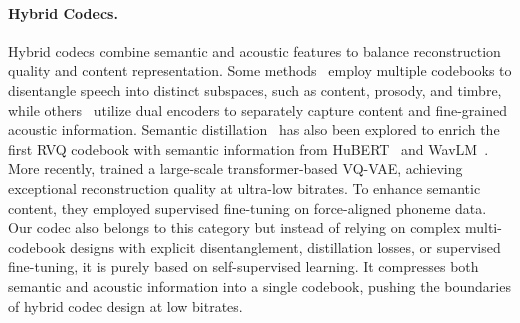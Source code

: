 \paragraph{Hybrid Codecs.}
Hybrid codecs combine semantic and acoustic features to balance reconstruction quality and content representation. Some methods~\cite{ju2024facodec, jiang2024unicodec, zheng2024freecodec} employ multiple codebooks to disentangle speech into distinct subspaces, such as content, prosody, and timbre, while others~\cite{liu2024semanticodec} utilize dual encoders to separately capture content and fine-grained acoustic information. Semantic distillation~\cite{zhang2024speechtokenizer, defossez2024moshi} has also been explored to enrich the first RVQ codebook with semantic information from HuBERT~\cite{hsu2021hubert} and WavLM~\cite{chen2022wavlm}. More recently, \citet{parker2024scaling} trained a large-scale transformer-based VQ-VAE, achieving exceptional reconstruction quality at ultra-low bitrates. To enhance semantic content, they employed supervised fine-tuning on force-aligned phoneme data.
Our codec also belongs to this category but instead of relying on complex multi-codebook designs with explicit disentanglement, distillation losses, or supervised fine-tuning, it is purely based on self-supervised learning. It compresses both semantic and acoustic information into a single codebook, pushing the boundaries of hybrid codec design at low bitrates.